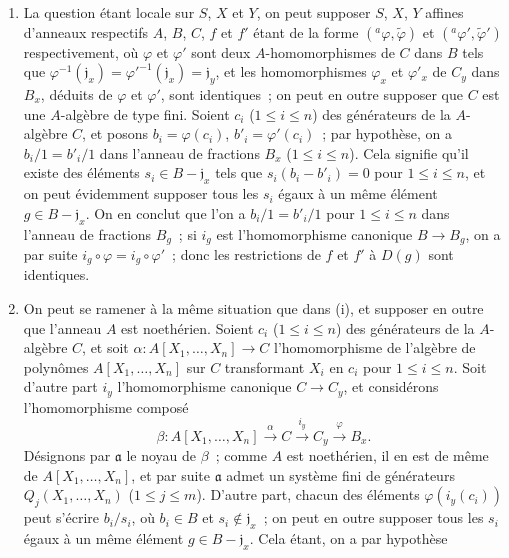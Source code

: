 \begin{enumerate}
  \item[(i)] La question étant locale sur $S$, $X$ et $Y$, on peut supposer
    $S$, $X$, $Y$ affines d'anneaux respectifs $A$, $B$, $C$, $f$ et $f'$
    étant de la forme $({}^a\varphi,\widetilde{\varphi})$ et
    $({}^a\varphi',\widetilde{\varphi}')$ respectivement, où $\varphi$ et
    $\varphi'$ sont deux $A$-homomorphismes de $C$ dans $B$ tels que
    $\varphi^{-1}(\mathfrak{j}_x)={\varphi'}^{-1}(\mathfrak{j}_x)
    =\mathfrak{j}_y$, et les homomorphismes $\varphi_x$ et $\varphi'_x$ de
    $C_y$ dans $B_x$, déduits de $\varphi$ et $\varphi'$, sont identiques~;
    on peut en outre supposer que $C$ est une $A$-algèbre de type fini. Soient
    $c_i$ ($1\leq i\leq n$) des générateurs de la $A$-algèbre $C$, et posons
    $b_i=\varphi(c_i)$, $b'_i=\varphi'(c_i)$~; par hypothèse, on a
    $b_i/1=b'_i/1$ dans l'anneau de fractions $B_x$ ($1\leq i\leq n$). Cela
    signifie qu'il existe des éléments $s_i\in B-\mathfrak{j}_x$ tels que
    $s_i(b_i-b'_i)=0$ pour $1\leq i\leq n$, et on peut évidemment supposer
    tous les $s_i$ égaux à un même élément $g\in B-\mathfrak{j}_x$. On en
    conclut que l'on a $b_i/1=b'_i/1$ pour $1\leq i\leq n$ dans l'anneau de
    fractions $B_g$~; si $i_g$ est l'homomorphisme canonique $B\to B_g$, on a
    par suite $i_g\circ\varphi=i_g\circ\varphi'$~; donc les restrictions de
    $f$ et $f'$ à $D(g)$ sont identiques.
  \item[(ii)] On peut se ramener à la même situation que dans (i), et supposer
    en outre que l'anneau $A$ est noethérien. Soient $c_i$
    ($1\leq i\leq n$) des générateurs de la $A$-algèbre $C$, et soit
    $\alpha:A[X_1,\ldots,X_n]\to C$ l'homomorphisme de l'algèbre de polynômes
    $A[X_1,\ldots,X_n]$ sur $C$ transformant $X_i$ en $c_i$ pour
    $1\leq i\leq n$. Soit d'autre part $i_y$ l'homomorphisme canonique
    $C\to C_y$, et considérons l'homomorphisme composé
    \[
      \beta:A[X_1,\ldots,X_n]
      \xrightarrow{\alpha} C
      \xrightarrow{i_y} C_y
      \xrightarrow{\varphi} B_x.
    \]
    Désignons par $\mathfrak{a}$ le noyau de $\beta$~; comme $A$ est
    noethérien, il en est de même de $A[X_1,\ldots,X_n]$, et par suite
    $\mathfrak{a}$ admet un système fini de générateurs
    $Q_j(X_1,\ldots,X_n)$ ($1\leq j\leq m$). D'autre part, chacun des
    éléments $\varphi(i_y(c_i))$ peut s'écrire $b_i/s_i$, où $b_i\in B$ et
    $s_i\notin\mathfrak{j}_x$~; on peut en outre supposer tous les $s_i$ égaux
    à un même élément $g\in B-\mathfrak{j}_x$. Cela étant, on a par hypothèse

\end{enumerate}
